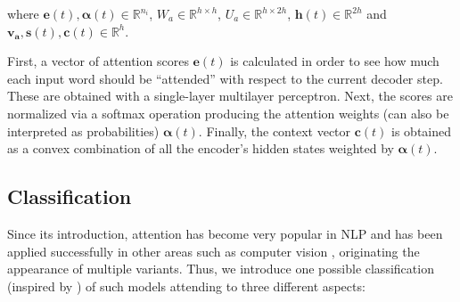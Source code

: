 where $\mathbf{e}(t),\boldsymbol{\alpha}(t) \in \mathbb{R}^{n_i}$, $W_a \in \mathbb{R}^{h \times h}$, $U_a \in \mathbb{R}^{h \times 2h}$, $\mathbf{h}(t) \in \mathbb{R}^{2h}$ and $\mathbf{v_a},\mathbf{s}(t),\mathbf{c}(t) \in \mathbb{R}^{h}$. 

First, a vector of attention scores $\mathbf{e}(t)$ is calculated in order to see how much each input word should be ``attended'' with respect to the current decoder step. These are obtained with a single-layer multilayer perceptron. Next, the scores are normalized via a softmax operation producing the attention weights (can also be interpreted as probabilities)  $\boldsymbol{\alpha}(t)$. Finally, the context vector $\mathbf{c}(t)$ is obtained as a convex combination of all the encoder's hidden states weighted by $\boldsymbol{\alpha}(t)$.

\subsection{Classification}

Since its introduction, attention has become very popular in NLP and has been applied successfully in other areas such as computer vision \cite{xu2015show}, originating the appearance of multiple variants. Thus, we introduce one possible classification (inspired by \cite{luongeffective}) of such models attending to three different aspects:

